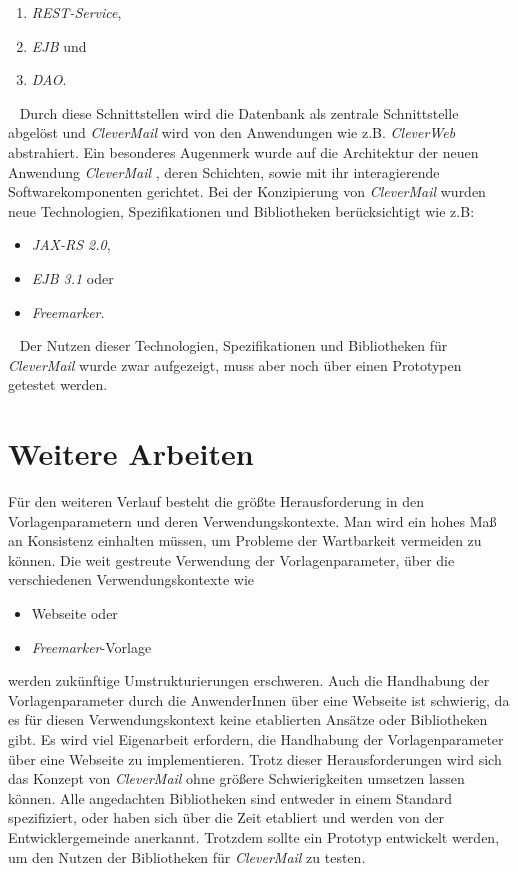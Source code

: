 \begin{enumerate}
	\item \emph{REST-Service},
	\item \emph{EJB} und
	\item \emph{DAO}.
\end{enumerate}
\ \newline
Durch diese Schnittstellen wird die Datenbank als zentrale Schnittstelle abgelöst und \emph{CleverMail} wird von den Anwendungen wie z.B. \emph{CleverWeb} abstrahiert. Ein besonderes Augenmerk wurde auf die Architektur der neuen Anwendung \emph{CleverMail} , deren Schichten, sowie mit ihr interagierende Softwarekomponenten gerichtet. Bei der Konzipierung von \emph{CleverMail} wurden neue Technologien, Spezifikationen und Bibliotheken berücksichtigt wie z.B:
\begin{itemize}
	\item \emph{JAX-RS 2.0},
	\item \emph{EJB 3.1} oder
	\item \emph{Freemarker}.
\end{itemize}
\ \newline
Der Nutzen dieser Technologien, Spezifikationen und Bibliotheken für \emph{CleverMail} wurde zwar aufgezeigt, muss aber noch über einen Prototypen getestet werden.

\section{Weitere Arbeiten}
Für den weiteren Verlauf besteht die größte Herausforderung in den Vorlagenparametern und deren Verwendungskontexte. Man wird ein hohes Maß an Konsistenz einhalten müssen, um Probleme der Wartbarkeit vermeiden zu können. Die weit gestreute Verwendung der Vorlagenparameter, über die verschiedenen Verwendungskontexte wie
\begin{itemize}
	\item Webseite oder
	\item \emph{Freemarker}-Vorlage
\end{itemize} 
werden zukünftige Umstrukturierungen erschweren. Auch die Handhabung der Vorlagenparameter durch die AnwenderInnen über eine Webseite ist schwierig, da es für diesen Verwendungskontext keine etablierten Ansätze oder Bibliotheken gibt. Es wird viel Eigenarbeit erfordern, die Handhabung der Vorlagenparameter über eine Webseite zu implementieren. Trotz dieser Herausforderungen wird sich das Konzept von \emph{CleverMail} ohne größere Schwierigkeiten umsetzen lassen können. Alle angedachten Bibliotheken sind entweder in einem Standard spezifiziert, oder haben sich über die Zeit etabliert und werden von der Entwicklergemeinde anerkannt. Trotzdem sollte ein Prototyp entwickelt werden, um den Nutzen der Bibliotheken für \emph{CleverMail} zu testen.

